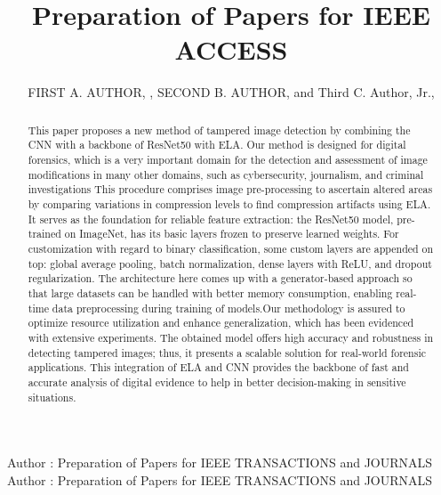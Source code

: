 \documentclass{ieeeaccess}
\begin{document}

\title{Preparation of Papers for IEEE ACCESS}
\author{\uppercase{First A. Author}, ,
\uppercase{Second B. Author}, and Third C. Author,
Jr.,
}

\address[1]{National Institute of Standards and
Technology, Boulder, CO 80305 USA (e-mail: author@boulder.nist.gov)}
\address[2]{Department of Physics, Colorado State University, Fort Collins,
CO 80523 USA (e-mail: author@lamar.colostate.edu)}
\address[3]{Electrical Engineering Department, University of Colorado, Boulder, CO
80309 USA}

\markboth
{Author \headeretal: Preparation of Papers for IEEE TRANSACTIONS and JOURNALS}
{Author \headeretal: Preparation of Papers for IEEE TRANSACTIONS and JOURNALS}



\begin{abstract}
This paper proposes a new method of tampered image detection by combining the CNN with a backbone of ResNet50 with ELA. Our method is designed for digital forensics, which is a very important domain for the detection and assessment of image modifications in many other domains, such as cybersecurity, journalism, and criminal investigations This procedure comprises image pre-processing to ascertain altered areas by comparing variations in compression levels to find compression artifacts using ELA. It serves as the foundation for reliable feature extraction: the ResNet50 model, pre-trained on ImageNet, has its basic layers frozen to preserve learned weights.
For customization with regard to binary classification, some custom layers are appended on top: global average pooling, batch normalization, dense layers with ReLU, and dropout regularization. The architecture here comes up with a generator-based approach so that large datasets can be handled with better memory consumption, enabling real-time data preprocessing during training of models.Our methodology is assured to optimize resource utilization and enhance generalization, which has been evidenced with extensive experiments. The obtained model offers high accuracy and robustness in detecting tampered images; thus, it presents a scalable solution for real-world forensic applications. This integration of ELA and CNN provides the backbone of fast and accurate analysis of digital evidence to help in better decision-making in sensitive situations.
\end{abstract}
\end{document}
